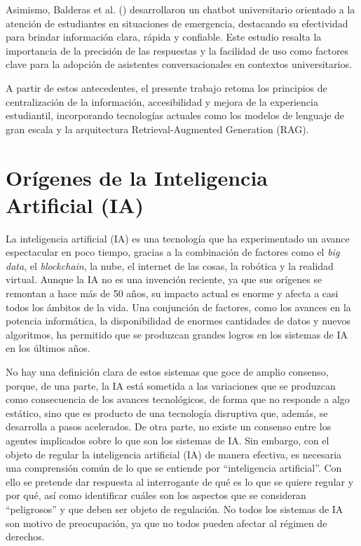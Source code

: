 {{Asimismo, Balderas et al. (\cite{balderas2023emergencysituation}) desarrollaron un chatbot universitario orientado a la atención de estudiantes en situaciones de emergencia, destacando su efectividad para brindar información clara, rápida y confiable. Este estudio resalta la importancia de la precisión de las respuestas y la facilidad de uso como factores clave para la adopción de asistentes conversacionales en contextos universitarios.

A partir de estos antecedentes, el presente trabajo retoma los principios de centralización de la información, accesibilidad y mejora de la experiencia estudiantil, incorporando tecnologías actuales como los modelos de lenguaje de gran escala y la arquitectura Retrieval-Augmented Generation (RAG).


\section{Orígenes de la Inteligencia Artificial (IA)}

La inteligencia artificial (IA) es una tecnología que ha experimentado un avance espectacular en poco tiempo, gracias a la combinación de factores como el \textit{big data}, el \textit{blockchain}, la nube, el internet de las cosas, la robótica y la realidad virtual. Aunque la IA no es una invención reciente, ya que sus orígenes se remontan a hace más de 50 años, su impacto actual es enorme y afecta a casi todos los ámbitos de la vida. Una conjunción de factores, como los avances en la potencia informática, la disponibilidad de enormes cantidades de datos y nuevos algoritmos, ha permitido que se produzcan grandes logros en los sistemas de IA en los últimos años.

No hay una definición clara de estos sistemas que goce de amplio consenso, porque, de una parte, la IA está sometida a las variaciones que se produzcan como consecuencia de los avances tecnológicos, de forma que no responde a algo estático, sino que es producto de una tecnología disruptiva que, además, se desarrolla a pasos acelerados. De otra parte, no existe un consenso entre los agentes implicados sobre lo que son los sistemas de IA. Sin embargo, con el objeto de regular la inteligencia artificial (IA) de manera efectiva, es necesaria una comprensión común de lo que se entiende por “inteligencia artificial”. Con ello se pretende dar respuesta al interrogante de qué es lo que se quiere regular y por qué, así como identificar cuáles son los aspectos que se consideran “peligrosos” y que deben ser objeto de regulación. No todos los sistemas de IA son motivo de preocupación, ya que no todos pueden afectar al régimen de derechos.

}}
